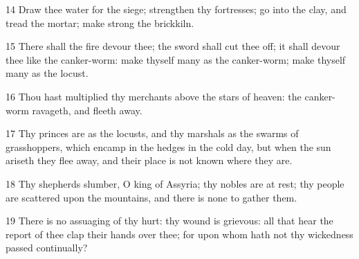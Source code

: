 \par 14 Draw thee water for the siege; strengthen thy fortresses; go into the clay, and tread the mortar; make strong the brickkiln.
\par 15 There shall the fire devour thee; the sword shall cut thee off; it shall devour thee like the canker-worm: make thyself many as the canker-worm; make thyself many as the locust.
\par 16 Thou hast multiplied thy merchants above the stars of heaven: the canker-worm ravageth, and fleeth away.
\par 17 Thy princes are as the locusts, and thy marshals as the swarms of grasshoppers, which encamp in the hedges in the cold day, but when the sun ariseth they flee away, and their place is not known where they are.
\par 18 Thy shepherds slumber, O king of Assyria; thy nobles are at rest; thy people are scattered upon the mountains, and there is none to gather them.
\par 19 There is no assuaging of thy hurt: thy wound is grievous: all that hear the report of thee clap their hands over thee; for upon whom hath not thy wickedness passed continually?

